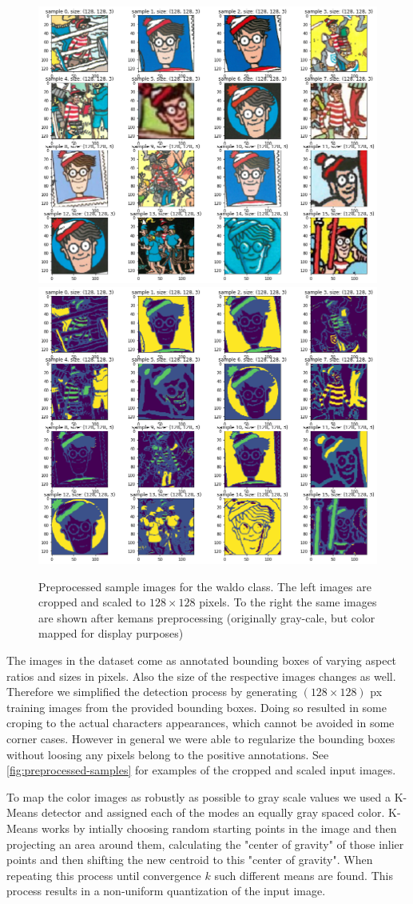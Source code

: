 \documentclass[11pt]{article}
\begin{document}
\begin{figure}[]
    \centering
    \includegraphics[width=0.4\linewidth]{figures/preprocess_waldo} 
    \hspace{1cm}
    \includegraphics[width=0.4\linewidth]{figures/kmeans_waldo} 
    \caption{Preprocessed sample images for the waldo class. The left images are cropped and scaled to \( 128 \times 128 \) pixels.
    To the right the same images are shown after kemans preprocessing (originally gray-cale, but color mapped for display purposes)}
    \label{fig:preprocessed-samples}
\end{figure}

The images in the dataset come as annotated bounding boxes of varying aspect ratios and sizes in pixels.
Also the size of the respective images changes as well. Therefore we simplified the detection process by
generating \( (128 \times 128) \) px training images from the provided bounding boxes. 
Doing so resulted in some croping to the actual characters appearances, which cannot be avoided in some corner cases.
However in general we were able to regularize the bounding boxes without loosing any pixels belong to the positive annotations.
See \autoref{fig:preprocessed-samples} for examples of the cropped and scaled input images.

To map the color images as robustly as possible to gray scale values we used a K-Means detector 
and assigned each of the modes an equally gray spaced color. 
K-Means works by intially choosing random starting points in the image and then projecting an area around them, calculating the "center of gravity"
of those inlier points and then shifting the new centroid to this "center of gravity". When repeating this
process until convergence \( k \) such different means are found. This process results in a non-uniform quantization of the input image.
\end{document}
